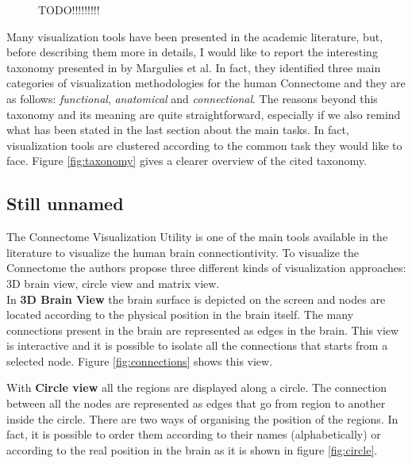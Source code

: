 \documentclass{article}
\begin{document}
\begin{multicols}{2}
\begin{figure}[ht]
	\caption{TODO!!!!!!!!!}
\end{figure}

Many visualization tools have been presented in the academic literature, but, before describing them more in details, I would like to report the interesting taxonomy presented in \cite{visualizingHumanConnectome} by Margulies et al. In fact, they identified three main categories of visualization methodologies for the human Connectome and they are as follows: \textit{functional}, \textit{anatomical} and \textit{connectional}. The reasons beyond this taxonomy and its meaning are quite straightforward, especially if we also remind what has been stated in the last section about the main tasks. In fact, visualization tools are clustered according to the common task they would like to face. Figure \ref{fig:taxonomy} gives a clearer overview of the cited taxonomy. 






\subsection{Still unnamed}
The Connectome Visualization Utility \cite{connectomeVisualizationUtility} is one of the main tools available in the literature to visualize the human brain connectiontivity. To visualize the Connectome the authors propose three different kinds of visualization approaches: 3D brain view, circle view and matrix view.\\
In \textbf{3D Brain View} the brain surface is depicted on the screen and nodes are located according to the physical position in the brain itself. The many connections present in the brain are represented as edges in the brain. This view is interactive and it is possible to isolate all the connections that starts from a selected node. Figure \ref{fig:connections} shows this view.



With \textbf{Circle view} all the regions are displayed along a circle. The connection between all the nodes are represented as edges that go from region to another inside the circle. There are two ways of organising the position of the regions. In fact, it is possible to order them according to their names (alphabetically) or according to the real position in the brain as it is shown in figure \ref{fig:circle}.


\end{multicols}
\end{document}
